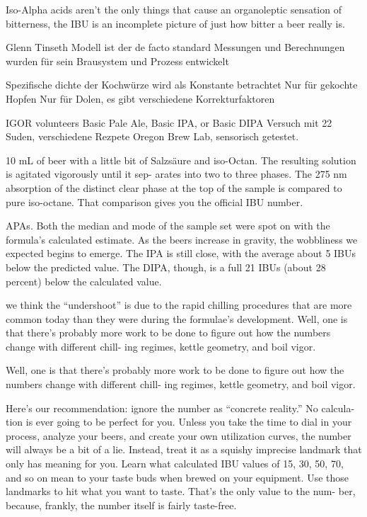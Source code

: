 \documentclass[a4paper,parskip=half]{scrartcl}
\begin{document}
Iso-Alpha acids aren’t the only things that cause an organoleptic
sensation of bitterness, the IBU is an incomplete picture of just how bitter a
beer really is.

Glenn Tinseth Modell ist der de facto standard
Messungen und Berechnungen wurden für sein Brausystem und Prozess entwickelt

\parencite[61]{Beechum2017}
Spezifische dichte der Kochwürze wird als Konstante betrachtet
Nur für gekochte Hopfen
Nur für Dolen, es gibt verschiedene Korrekturfaktoren

IGOR volunteers Basic Pale Ale, Basic IPA, or
Basic DIPA 
Versuch mit 22 Suden, verschiedene Rezpete
Oregon Brew Lab, sensorisch getestet.

\parencite[62]{Beechum2017}
10 mL of beer with a little bit of Salzsäure and iso-Octan. The resulting
solution is agitated vigorously until it sep-
arates into two to three phases. The 275
nm absorption of the distinct clear phase
at the top of the sample is compared to
pure iso-octane. That comparison gives
you the official IBU number.

APAs. Both the median and mode of the
sample set were spot on with the formula’s
calculated estimate. As the beers increase
in gravity, the wobbliness we expected
begins to emerge. The IPA is still close,
with the average about 5 IBUs below the
predicted value. The DIPA, though, is a
full 21 IBUs (about 28 percent) below the
calculated value.

\parencite[65]{Beechum2017}
we think the “undershoot” is due to the
rapid chilling procedures that are more
common today than they were during the
formulae’s development.
Well,
one is that there’s probably more work
to be done to figure out how the
numbers change with different chill-
ing regimes, kettle geometry, and boil
vigor.

Well,
one is that there’s probably more work
to be done to figure out how the
numbers change with different chill-
ing regimes, kettle geometry, and boil
vigor.

\parencite[65\psqq]{Beechum2017}
Here’s our recommendation: ignore the
number as “concrete reality.” No calcula-
tion is ever going to be perfect for you.
Unless you take the time to dial in your
process, analyze your beers, and create
your own utilization curves, the number
will always be a bit of a lie. Instead, treat it
as a squishy imprecise landmark that only
has meaning for you.
Learn what calculated IBU values of 15,
30, 50, 70, and so on mean to your taste
buds when brewed on your equipment.
Use those landmarks to hit what you want
to taste. That’s the only value to the num-
ber, because, frankly, the number itself is
fairly taste-free.
\end{document}
